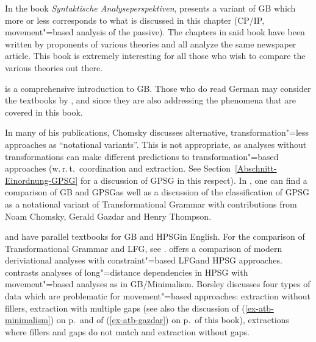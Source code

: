 In the book \emph{Syntaktische Analyseperspektiven}, \citet{Lohnstein2014a} presents a variant of GB
which more or less corresponds to what is discussed
in this chapter (CP/IP, movement"=based analysis of the passive). The chapters in said book have been written by proponents of various theories
and all analyze the same newspaper article. This book is extremely interesting for all those who wish to compare the various theories out there.

 is a comprehensive introduction to GB. Those who do read German may consider
the textbooks by ,  and  since they are also
addressing the phenomena that are covered in this book.

In many of his publications, Chomsky discusses alternative, transformation"=less approaches as ``notational variants''.
This is not appropriate, as analyses without transformations can make different predictions to transformation"=based approaches (\eg w.\,r.\,t.\ coordination
and extraction. See Section~\ref{Abschnitt-Einordnung-GPSG} for a discussion of GPSG in this respect). In , one can find a comparison
of GB and GPSG\indexgpsg as well as a discussion of the classification of GPSG as a notational variant of Transformational Grammar with contributions
from Noam Chomsky, Gerald Gazdar and Henry Thompson.


\citet{Borsley99a-u} and \citet{KS2008a-u} have parallel textbooks for GB and HPSG\indexhpsg in English. For the comparison of Transformational Grammar
and LFG, see .  offers a comparison of modern deriviational analyses with constraint"=based LFG\indexlfg and HPSG approaches.
\citet{Borsley2012a} contrasts analyses of long"=distance dependencies in HPSG with movement"=based analyses as in GB/Minimalism. Borsley discusses
four types of data which are problematic for movement"=based approaches: extraction without fillers,
extraction with multiple gaps (see also the discussion of (\ref{ex-atb-minimalism}) on
p.\,\pageref{ex-atb-minimalism} and of (\ref{ex-atb-gazdar}) on p.\,\pageref{ex-atb-gazdar} of this
book), extractions where fillers and gaps do not match and extraction without gaps.
















